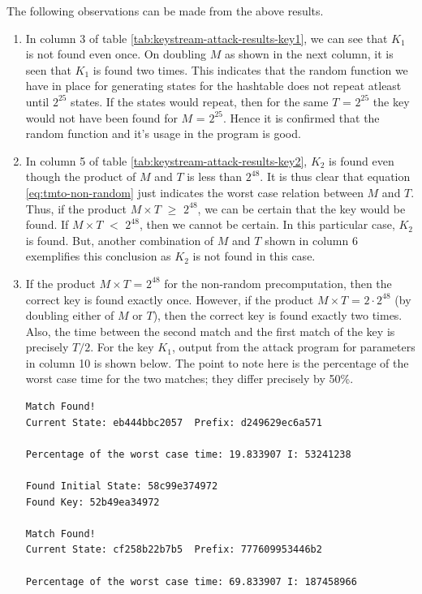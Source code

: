 The following observations can be made from the above results. 
\begin{enumerate}
\item In column 3 of table \ref{tab:keystream-attack-results-key1}, we can see that $K_1$ is not found even once. On doubling $M$ as shown in the next column, it is seen that $K_1$ is found two times. This indicates that the random function we have in place for generating states for the hashtable does not repeat atleast until $2^{25}$ states. If the states would repeat, then for the same $T$ = $2^{25}$ the key would not have been found for $M$ = $2^{25}$. Hence it is confirmed that the random function and it's usage in the program is good.

\item In column 5 of table \ref{tab:keystream-attack-results-key2}, $K_2$ is found even though the product of $M$ and $T$ is less than $2^{48}$. It is thus clear that equation \ref{eq:tmto-non-random} just indicates the worst case relation between $M$ and $T$. Thus, if the product $M \times T$ $\geq$ $2^{48}$, we can be certain that the key would be found. If $M \times T$ $<$ $2^{48}$, then we cannot be certain. In this particular case, $K_2$ is found. But, another combination of $M$ and $T$ shown in column 6 exemplifies this conclusion as $K_2$ is not found in this case.

\item If the product $M \times T$ = $2^{48}$ for the non-random precomputation, then the correct key is found exactly once. However, if the product $M \times T$ = $2 \cdot 2^{48}$ (by doubling either of $M$ or $T$), then the correct key is found exactly two times. Also, the time between the second match and the first match of the key is precisely $T/2$. For the key $K_1$, output from the attack program for parameters in column 10 is shown below. The point to note here is the percentage of the worst case time for the two matches; they differ precisely by 50\%. 
\newpage
\begin{lstlisting}[frame=tb]
Match Found! 
Current State: eb444bbc2057  Prefix: d249629ec6a571

Percentage of the worst case time: 19.833907 I: 53241238

Found Initial State: 58c99e374972
Found Key: 52b49ea34972

Match Found! 
Current State: cf258b22b7b5  Prefix: 777609953446b2

Percentage of the worst case time: 69.833907 I: 187458966


\end{lstlisting}
\end{enumerate}
